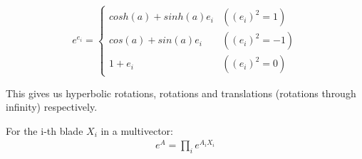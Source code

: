 \documentclass[twoside]{article}
\newcommand{\B}[1]{\left(#1\right)} %
\begin{document}
\begin{multicols*}{2}
                $$ e^{e_i} = \begin{cases}
                    cosh(a) + sinh(a) e_i & (\B{e_i}^2 = 1) \\
                    cos(a) + sin(a) e_i & (\B{e_i}^2 = -1) \\
                    1 + e_i & (\B{e_i}^2 = 0)
                \end{cases}$$
            \par
                This gives us hyperbolic rotations, rotations and translations (rotations through infinity) respectively.
            \par
                For the i-th blade $ X_i $ in a multivector:
                \begin{gather*}
                    e^A = \prod_i e^{A_i X_i} \\
                \end{gather*}

\end{multicols*}
\end{document}
